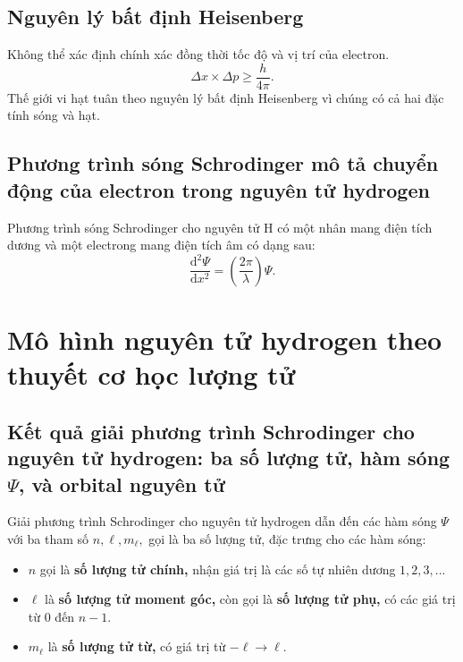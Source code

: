 \subsection{Nguyên lý bất định Heisenberg}
Không thể xác định chính xác đồng thời tốc độ và vị trí của electron.
$$\Delta x \times \Delta p \geqslant \frac{h}{4 \pi}.$$
Thế giới vi hạt tuân theo nguyên lý bất định Heisenberg vì chúng có cả hai đặc tính sóng và hạt.
\subsection{Phương trình sóng Schrodinger mô tả chuyển động của electron trong nguyên tử hydrogen}
Phương trình sóng Schrodinger cho nguyên tử $\mathrm{H}$ có một nhân mang điện tích dương và một electrong mang điện tích âm có dạng sau:
$$\frac{{{\mathrm{d}^2}\Psi }}{{\mathrm{d}{x^2}}} = \left( {\frac{{2\pi }}{\lambda }} \right)\Psi .$$
\section{Mô hình nguyên tử hydrogen theo thuyết cơ học lượng tử}
\subsection{Kết quả giải phương trình Schrodinger cho nguyên tử hydrogen: ba số lượng tử, hàm sóng $\Psi$, và orbital nguyên tử}
Giải phương trình Schrodinger cho nguyên tử hydrogen dẫn đến các hàm sóng $\Psi$ với ba tham số $n, \ell, m_{\ell},$ gọi là ba số lượng tử, đặc trưng cho các hàm sóng:
\begin{itemize}
\item $n$ gọi là \textbf{số lượng tử chính,} nhận giá trị là các số tự nhiên dương $1, 2, 3, ...$
\item $\ell$ là \textbf{số lượng tử moment góc,} còn gọi là \textbf{số lượng tử phụ,} có các giá trị từ $0$ đến $n - 1.$
\item $m_{\ell}$ là \textbf{số lượng tử từ,} có giá trị từ $- \ell \to \ell.$
\end{itemize}
